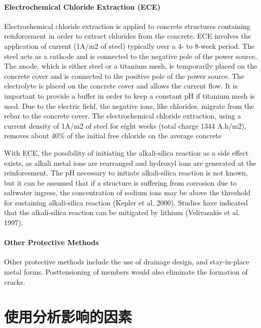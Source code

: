 \paragraph{Electrochemical Chloride Extraction (ECE)}
Electrochemical chloride extraction is applied to concrete structures containing reinforcement in order to extract
chlorides from the concrete. ECE involves the application of current (1A/m2 of steel) typically over a 4- to 8-week
period. The steel acts as a cathode and is connected to the negative pole of the power source. The anode, which is
either steel or a titanium mesh, is temporarily placed on the concrete cover and is connected to the positive pole of
the power source. The electrolyte is placed on the concrete cover and allows the current flow. It is important to
provide a buffer in order to keep a constant pH if titanium mesh is used. Due to the electric field, the negative ions,
like chlorides, migrate from the rebar to the concrete cover. The electrochemical chloride extraction, using a current
density of 1A/m2 of steel for eight weeks (total charge 1344 A.h/m2), removes about 40\% of the initial free chloride
on the average concrete

With ECE, the possibility of initiating the alkali-silica reaction as a side effect exists, as alkali metal ions are
rearranged and hydroxyl ions are generated at the reinforcement. The pH necessary to initiate alkali-silica reaction is
not known, but it can be assumed that if a structure is suffering from corrosion due to saltwater ingress, the
concentration of sodium ions may be above the threshold for sustaining alkali-silica reaction (Kepler et al. 2000).
Studies have indicated that the alkali-silica reaction can be mitigated by lithium (Velivasakis et al. 1997).

\paragraph{Other Protective Methods}

Other protective methods include the use of drainage design, and stay-in-place metal forms. Posttensioning of
members would also eliminate the formation of cracks.

\section{使用分析影响的因素}
\label{sec:factor-influence-fault-tree}
